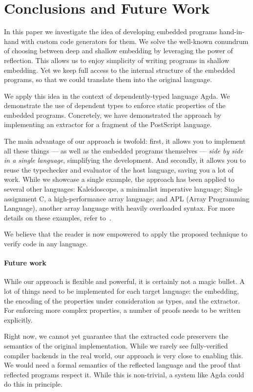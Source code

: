 \documentclass[sigplan,screen]{acmart}
\begin{document}
\section{Conclusions and Future Work} \label{sec:conclusion}


In this paper we investigate the idea of developing
embedded programs hand-in-hand with custom
code generators for them. We solve the well-known
conundrum of choosing between deep and shallow
embedding by leveraging the power of
reflection.
This allows us to enjoy simplicity of writing programs
in shallow embedding.  Yet we keep full access to the internal
structure of the embedded programs, so that we could translate
them into the original language.

We apply this idea in the context of dependently-typed
language Agda.  We demonstrate the use of dependent types
to enforce static properties of the embedded programs.
Concretely, we have demonstrated the approach by implementing
an extractor for a fragment of the PostScript language.

The main advantage of our approach is twofold: first, it allows
you to implement all these things --- as well as the embedded programs
themselves --- \emph{side by side in a single language}, simplifying
the development. And secondly, it allows you to reuse the typechecker
and evaluator of the host language, saving you a lot of work.
While we showcase a single example, the approach has been applied
to several other languages: Kaleidoscope, a minimalist imperative language;
Single assignment C, a high-performance array language; and
APL (Array Programming Language), another array language with
heavily overloaded syntax.
For more details on these examples,
refer to~\citet{DBLP:journals/corr/abs-2105-10819}.

We believe that the reader is now empowered to apply the proposed
technique to verify code in any language.



\paragraph{Future work}
While our approach is flexible and powerful, it is
certainly not a magic bullet. A lot of things
need to be implemented for each target language: the embedding,
the encoding of the properties under consideration as types,
and the extractor.  For enforcing more complex properties, a number
of proofs needs to be written explicitly.

Right now, we cannot yet guarantee that the
extracted code preservers the semantics of the original
implementation. While we rarely see
fully-verified compiler backends in the real world,
our approach is very close to enabling this.
We would need a formal semantics of the reflected language
and the proof that reflected programs respect it.
While this is non-trivial, a system like Agda could do
this in principle.
\end{document}
